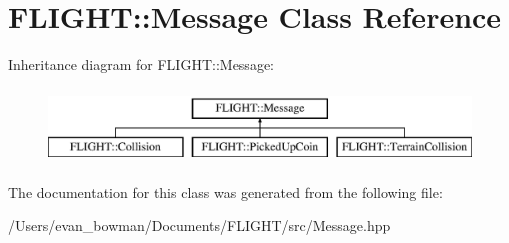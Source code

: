 \hypertarget{class_f_l_i_g_h_t_1_1_message}{}\section{F\+L\+I\+G\+HT\+:\+:Message Class Reference}
\label{class_f_l_i_g_h_t_1_1_message}
Inheritance diagram for F\+L\+I\+G\+HT\+:\+:Message\+:\begin{figure}[H]
\begin{center}
\leavevmode
\includegraphics[height=2.000000cm]{class_f_l_i_g_h_t_1_1_message}
\end{center}
\end{figure}


The documentation for this class was generated from the following file\+:\begin{DoxyCompactItemize}
\item 
/\+Users/evan\+\_\+bowman/\+Documents/\+F\+L\+I\+G\+H\+T/src/Message.\+hpp\end{DoxyCompactItemize}
